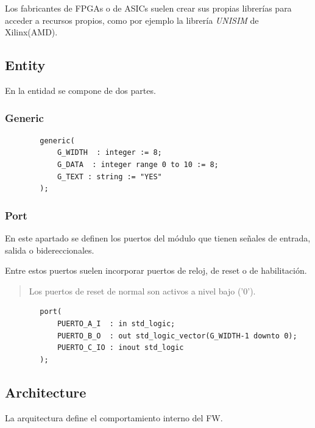 Los fabricantes de FPGAs o de ASICs suelen crear sus propias
librerías para acceder a recursos propios, 
como por ejemplo la librería \textit{UNISIM} de Xilinx(AMD).


\subsection{Entity}
En la entidad se compone de dos partes.

\subsubsection{Generic}


    \begin{verbatim}
        generic(
            G_WIDTH  : integer := 8;
            G_DATA  : integer range 0 to 10 := 8;
            G_TEXT : string := "YES"
        );
    \end{verbatim}

\subsubsection{Port}
En este apartado se definen los puertos del módulo que tienen señales de entrada, 
salida o bidereccionales.

Entre estos puertos suelen incorporar puertos de reloj, de reset o de habilitación.

    \begin{quote}
        Los puertos de reset de normal son activos a nivel bajo ('0').
    \end{quote}

    \begin{verbatim}
        port(
            PUERTO_A_I  : in std_logic;
            PUERTO_B_O  : out std_logic_vector(G_WIDTH-1 downto 0);
            PUERTO_C_IO : inout std_logic
        );
    \end{verbatim}



\subsection{Architecture}

La arquitectura define el comportamiento interno del FW.